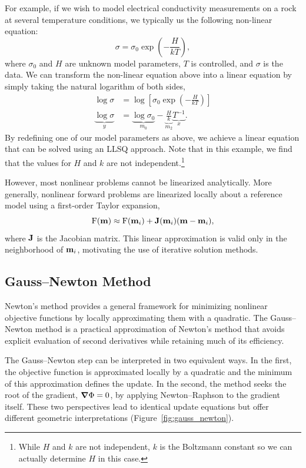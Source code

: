 For example, if we wish to model electrical conductivity measurements on a rock at several temperature conditions, we typically us the following non-linear equation:
\begin{equation*}
    \sigma = \sigma_0 \exp \left( -\frac{H} {kT} \right) ,
\end{equation*}
where $\sigma_0$ and $H$ are unknown model parameters, $T$ is controlled, and $\sigma$ is the data.  We can transform the non-linear equation above into a linear equation by simply taking the natural logarithm of both sides,
\begin{align*}
    \log \sigma &= \log \left[ \sigma_0\exp \left( -\frac{H} {kT} \right) \right] \\
    \underbrace{\log \sigma}_{y} &= \underbrace{\log \sigma_0}_{m_0} - \underbrace{\frac{H}{k}}_{m_2} \underbrace{T^{-1}}_{x} .
\end{align*}
By redefining one of our model parameters as above, we achieve a
linear equation that can be solved using an LLSQ approach. Note that in this example, we find that the values for $H$ and $k$ are not independent.\footnote{While $H$ and $k$ are not independent, $k$ is the Boltzmann constant so we can actually determine $H$ in this case.}

However, most nonlinear problems cannot be linearized analytically.  More generally, nonlinear forward problems are linearized locally about a reference model using a first-order Taylor expansion,
\[
    \operatorname{F}(\vb{m}) \approx \operatorname{F}(\vb{m}_i)
    + \vb{J}(\vb{m}_i)(\vb{m} - \vb{m}_i),
\]
where $\vb{J}$ is the Jacobian matrix. This linear approximation is valid only in the neighborhood of $\vb{m}_i$, motivating the use of iterative solution methods.

\subsection{Gauss--Newton Method}\label{sec:newton}

Newton's method provides a general framework for minimizing nonlinear objective functions by locally approximating them with a quadratic. The Gauss--Newton method is a practical approximation of Newton's method that avoids explicit evaluation of second derivatives while retaining much of its efficiency.

The Gauss--Newton step can be interpreted in two equivalent ways. 
In the first, the objective function is approximated locally by a quadratic and the minimum of this approximation defines the update.  In the second, the method seeks the root of the gradient, $\grad \Phi = 0$, by applying Newton--Raphson to the gradient itself. 
These two perspectives lead to identical update equations but offer different geometric interpretations (Figure~\ref{fig:gauss_newton}).

